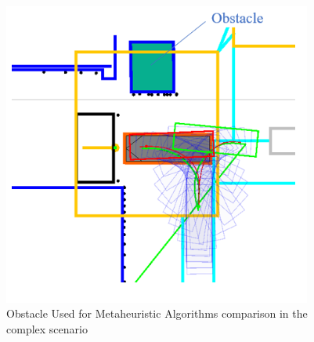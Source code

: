 \begin{figure}[H]
    \begin{center}
        \includegraphics[width=4in]{images/Chap3/obstacle_complicated.png} %
        \caption{Obstacle Used for Metaheuristic Algorithms comparison in the complex scenario}
        \label{OptResult9}
        \end{center}    
\end{figure}

\begin{table}[H]
    \centering
    \caption{Comparison of Planning Time for Different Algorithms in Simple and Complex Environments (in milliseconds)}

    \label{tab:planning_time}
\end{table}

